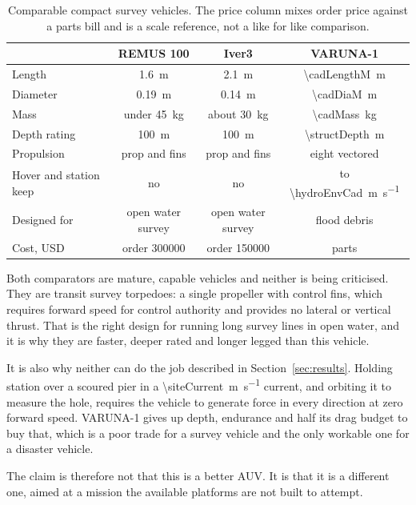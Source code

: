 \documentclass[10pt,a4paper]{article}
\begin{document}
\begin{table}[htbp]\centering\small
\caption{Comparable compact survey vehicles. The price column mixes order price
against a parts bill and is a scale reference, not a like for like comparison.}
\begin{tabular}{lccc}
\toprule
& \textbf{REMUS 100} & \textbf{Iver3} & \textbf{VARUNA-1} \\
\midrule
Length & \SI{1.6}{\metre} & \SI{2.1}{\metre} &
\SI{\cadLengthM}{\metre} \\
Diameter & \SI{0.19}{\metre} & \SI{0.14}{\metre} &
\SI{\cadDiaM}{\metre} \\
Mass & under \SI{45}{\kilo\gram} & about \SI{30}{\kilo\gram} &
\SI{\cadMass}{\kilo\gram} \\
Depth rating & \SI{100}{\metre} & \SI{100}{\metre} &
\SI{\structDepth}{\metre} \\
Propulsion & prop and fins & prop and fins & eight vectored \\
Hover and station keep & no & no & to
\SI{\hydroEnvCad}{\metre\per\second} \\
Designed for & open water survey & open water survey & flood debris \\
Cost, USD & order \num{300000} & order \num{150000} &
parts \bomTotal{} \\
\bottomrule
\end{tabular}
\end{table}

Both comparators are mature, capable vehicles and neither is being criticised.
They are transit survey torpedoes: a single propeller with control fins, which
requires forward speed for control authority and provides no lateral or
vertical thrust. That is the right design for running long survey lines in
open water, and it is why they are faster, deeper rated and longer legged than
this vehicle.

It is also why neither can do the job described in Section~\ref{sec:results}.
Holding station over a scoured pier in a \SI{\siteCurrent}{\metre\per\second}
current, and orbiting it to measure the hole, requires the vehicle to generate
force in every direction at zero forward speed. VARUNA-1 gives up depth,
endurance and half its drag budget to buy that, which is a poor trade for a
survey vehicle and the only workable one for a disaster vehicle.

The claim is therefore not that this is a better AUV. It is that it is a
different one, aimed at a mission the available platforms are not built to
attempt.
\end{document}
